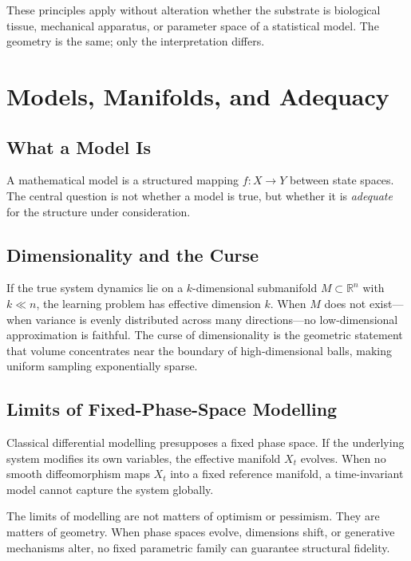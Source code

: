 \documentclass[12pt,openany]{book}
\newcommand{\R}{\mathbb{R}}
\begin{document}
\begin{insight}
  These principles apply without alteration whether the substrate is biological
  tissue, mechanical apparatus, or parameter space of a statistical model. The
  geometry is the same; only the interpretation differs.
\end{insight}

\chapter{Models, Manifolds, and Adequacy}
\label{ch:adequacy}

\section{What a Model Is}

A mathematical model is a structured mapping $f:X\to Y$ between state spaces.
The central question is not whether a model is true, but whether it is
\emph{adequate} for the structure under consideration.

\section{Dimensionality and the Curse}

If the true system dynamics lie on a $k$-dimensional submanifold $M\subset
\R^n$ with $k\ll n$, the learning problem has effective dimension $k$. When
$M$ does not exist—when variance is evenly distributed across many
directions—no low-dimensional approximation is faithful. The curse of
dimensionality is the geometric statement that volume concentrates near the
boundary of high-dimensional balls, making uniform sampling exponentially sparse.

\section{Limits of Fixed-Phase-Space Modelling}

Classical differential modelling presupposes a fixed phase space. If the
underlying system modifies its own variables, the effective manifold $X_t$
evolves. When no smooth diffeomorphism maps $X_t$ into a fixed reference
manifold, a time-invariant model cannot capture the system globally.

\begin{insight}
  The limits of modelling are not matters of optimism or pessimism. They are
  matters of geometry. When phase spaces evolve, dimensions shift, or generative
  mechanisms alter, no fixed parametric family can guarantee structural
  fidelity.
\end{insight}
\end{document}
